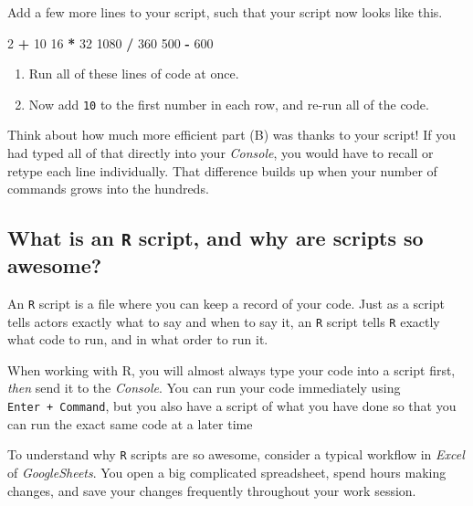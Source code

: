 \documentclass[
]{book}
\newenvironment{Shaded}{\begin{snugshade}}{\end{snugshade}}
\newcommand{\DecValTok}[1]{\textcolor[rgb]{0.00,0.00,0.81}{#1}}
\newcommand{\OperatorTok}[1]{\textcolor[rgb]{0.81,0.36,0.00}{\textbf{#1}}}
\newcommand{\StringTok}[1]{\textcolor[rgb]{0.31,0.60,0.02}{#1}}
\providecommand{\tightlist}{%
  \setlength{\itemsep}{0pt}\setlength{\parskip}{0pt}}
\begin{document}
Add a few more lines to your script, such that your script now looks like this.

\begin{Shaded}
\begin{Highlighting}[]
\DecValTok{2}  \OperatorTok{+}\StringTok{ }\DecValTok{10}
\DecValTok{16} \OperatorTok{*}\StringTok{ }\DecValTok{32}
\DecValTok{1080} \OperatorTok{/}\StringTok{ }\DecValTok{360}
\DecValTok{500} \OperatorTok{-}\StringTok{ }\DecValTok{600}
\end{Highlighting}
\end{Shaded}

\begin{enumerate}
\def\labelenumi{(\Alph{enumi})}
\tightlist
\item
  Run all of these lines of code at once.\\
\item
  Now add \texttt{10} to the first number in each row, and re-run all of the code.
\end{enumerate}

Think about how much more efficient part (B) was thanks to your script! If you had typed all of that directly into your \emph{Console}, you would have to recall or retype each line individually. That difference builds up when your number of commands grows into the hundreds.

\hypertarget{what-is-an-r-script-and-why-are-scripts-so-awesome}{%
\subsection*{\texorpdfstring{What is an \texttt{R} script, and why are scripts so awesome?}{What is an R script, and why are scripts so awesome?}}\label{what-is-an-r-script-and-why-are-scripts-so-awesome}}

An \texttt{R} script is a file where you can keep a record of your code. Just as a script tells actors exactly what to say and when to say it, an \texttt{R} script tells \texttt{R} exactly what code to run, and in what order to run it.

When working with R, you will almost always type your code into a script first, \emph{then} send it to the \emph{Console}. You can run your code immediately using \texttt{Enter\ +\ Command}, but you also have a script of what you have done so that you can run the exact same code at a later time

To understand why \texttt{R} scripts are so awesome, consider a typical workflow in \emph{Excel} of \emph{GoogleSheets}. You open a big complicated spreadsheet, spend hours making changes, and save your changes frequently throughout your work session.
\end{document}
